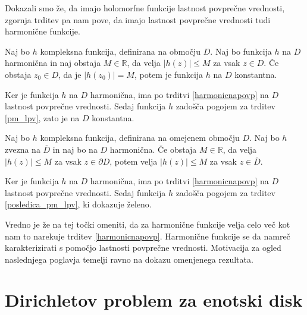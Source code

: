 \documentclass[mat1, tisk]{fmfdelo}
\begin{document}
    \begin{opomba}
        Dokazali smo že, da imajo holomorfne funkcije lastnost povprečne vrednosti, zgornja trditev pa nam pove, da imajo lastnost povprečne vrednosti tudi harmonične funkcije. 
    \end{opomba}

    \begin{posledica}
        \label{pm_harm}
        Naj bo $h$ kompleksna funkcija, definirana na območju $D$. Naj bo funkcija $h$ na $D$ harmonična in naj obstaja $M \in \mathbb{R}$, da velja $|h(z)| \leq M$ za vsak $z \in D$. 
        Če obstaja $z_0 \in D$, da je $|h(z_0)| = M$, potem je funkcija $h$ na $D$ konstantna.  
    \end{posledica}
    \begin{dokaz}
        Ker je funkcija $h$ na $D$ harmonična, ima po trditvi \ref{harmonicnapovp} na $D$ lastnost povprečne vrednosti. Sedaj funkcija $h$ zadošča pogojem za trditev \ref{pm_lpv}, zato je na $D$ konstantna.
    \end{dokaz}

    \begin{posledica}
        Naj bo $h$ kompleksna funkcija, definirana na omejenem območju $D$. Naj bo $h$ zvezna na $\overline{D}$ in naj bo na $D$ harmonična. 
        Če obstaja $M \in \mathbb{R}$, da velja $|h(z)| \leq M$ za vsak $z \in \partial D$, potem velja $|h(z)| \leq M$ za vsak $z \in \overline{D}$. 
    \end{posledica}
    \begin{dokaz}
        Ker je funkcija $h$ na $D$ harmonična, ima po trditvi \ref{harmonicnapovp} na $D$ lastnost povprečne vrednosti. Sedaj funkcija $h$ zadošča pogojem za trditev \ref{posledica_pm_lpv}, ki dokazuje želeno.
    \end{dokaz}

    \begin{opomba}
        \label{motivacija}
        Vredno je že na tej točki omeniti, da za harmonične funkcije velja celo več kot nam to narekuje trditev \ref{harmonicnapovp}. 
        Harmonične funkcije se da namreč karakterizirati s pomočjo lastnosti povprečne vrednosti. 
        Motivacija za ogled naslednjega poglavja temelji ravno na dokazu omenjenega rezultata.  
    \end{opomba}

\section{Dirichletov problem za enotski disk}
\end{document}
